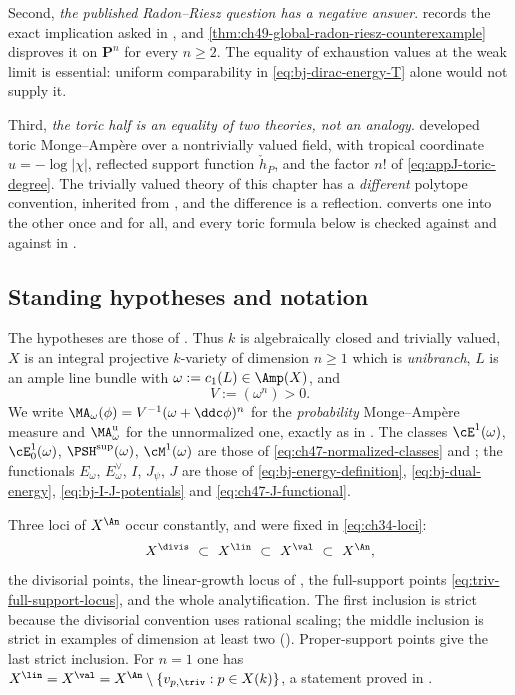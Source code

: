 Second, \emph{the published Radon--Riesz question has a negative answer}.
 records the exact implication asked in
\cite[Question~11.16]{BJ22}, and
\cref{thm:ch49-global-radon-riesz-counterexample} disproves it on
$\mathbf P^n$ for every $n\ge2$.  The equality of exhaustion values at
the weak limit is essential: uniform comparability in
\eqref{eq:bj-dirac-energy-T} alone would not supply it.

Third, \emph{the toric half is an equality of two theories, not an
analogy}.   developed toric Monge--Amp\`ere
over a nontrivially valued field, with tropical coordinate
$u=-\log|\chi|$, reflected support function $\check h_P$, and the
factor $n!$ of \eqref{eq:appJ-toric-degree}.  The trivially valued theory
of this chapter has a \emph{different} polytope convention, inherited from
\cite[Appendix~B]{BJ22}, and the difference is a reflection.
 converts one into the other once and for all,
and every toric formula below is checked against
 and against
 in .

\subsection{Standing hypotheses and notation}
\label{sec:ch49-hypotheses}

The hypotheses are those of
.
Thus $k$ is algebraically closed and trivially valued, $X$ is an
integral projective $k$-variety of dimension $n\ge1$ which is
\emph{unibranch}, $L$ is an ample line bundle with
$\omega:=c_1(L)\in\Amp(X)$, and
\[
 V:=(\omega^n)>0 .
\]
We write $\MA_\omega(\phi)=V^{-1}(\omega+\ddc\phi)^n$ for the
\emph{probability} Monge--Amp\`ere measure and $\MA^{\mathrm u}_\omega$
for the unnormalized one, exactly as in .
The classes $\cE^1(\omega)$, $\cE^1_0(\omega)$,
$\PSH^{\sup}(\omega)$, $\cM^1(\omega)$ are those of
\eqref{eq:ch47-normalized-classes} and
; the functionals
$E_\omega$, $E^\vee_\omega$, $I$, $J_\psi$, $J$ are those of
\eqref{eq:bj-energy-definition}, \eqref{eq:bj-dual-energy},
\eqref{eq:bj-I-J-potentials} and \eqref{eq:ch47-J-functional}.

Three loci of $X^{\An}$ occur constantly, and were fixed in
\eqref{eq:ch34-loci}:
\[
 X^{\divis}\ \subset\ X^{\lin}\ \subset\ X^{\val}\ \subset\ X^{\An},
\]
the divisorial points, the linear-growth locus of
, the full-support points
\eqref{eq:triv-full-support-locus}, and the whole analytification.  The first inclusion is strict because the divisorial convention uses
rational scaling; the middle inclusion is strict in examples of dimension
at least two ().  Proper-support points
give the last strict inclusion.  For $n=1$ one has
$X^{\lin}=X^{\val}=X^{\An}\setminus\{v_{p,\triv}:p\in X(k)\}$, a statement proved
in .

